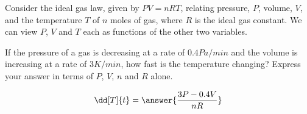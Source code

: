 \documentclass{ximera}
\author{David Guichard \and Neal Koblitz \and H. Jerome Keisler \and Albert Scheller \and Barry Balof \and Mike Wills \and Matthew Carr \and Bart Snapp}
\begin{document}
\begin{exercise}
Consider the ideal gas law, given by $PV=nRT$, relating pressure, $P$,
volume, $V$, and the temperature $T$ of $n$ moles of gas, where $R$ is
the ideal gas constant. We can view $P$, $V$ and $T$ each as functions
of the other two variables.

If the pressure of a gas is decreasing at a rate of $0.4\unit{Pa/min}$
and the volume is increasing at a rate of $3\unit{K/min}$, how fast is
the temperature changing? Express your answer in terms of $P$, $V$,
$n$ and $R$ alone.

\begin{prompt}
\[
\dd[T]{t}=\answer{\frac{3P-0.4 V}{n R}}
\]
\end{prompt}

\end{exercise}
\end{document}
